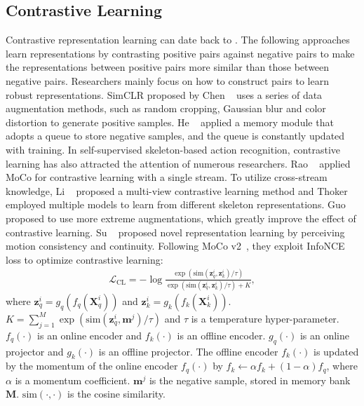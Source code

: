 \documentclass[twocolumn]{article}
\begin{document}
\subsection{Contrastive Learning}
\label{sec:contra}
Contrastive representation learning can date back to \cite{hadsell2006dimensionality}. The following approaches~\cite{tian2019contrastive,wu2018unsupervised,bachman2019learning,ye2019unsupervised,isola2015learning} learn representations by contrasting positive pairs against negative pairs to make the representations between positive pairs more similar than those between negative pairs. Researchers mainly focus on how to construct pairs to learn robust representations. SimCLR proposed by Chen \etal~\cite{chen2020simple} uses a series of data augmentation methods, such as random cropping, Gaussian blur and color distortion to generate positive samples. He \etal~\cite{he2020momentum} applied a memory module that adopts a queue to store negative samples, and the queue is constantly updated with training. In self-supervised skeleton-based action recognition, contrastive learning has also attracted the attention of numerous researchers. Rao \etal~\cite{rao2021augmented} applied MoCo for contrastive learning with a single stream. To utilize cross-stream knowledge, Li \etal~\cite{li20213d} proposed a multi-view contrastive learning method and Thoker \etal~\cite{thoker2021skeleton} employed multiple models to learn from different skeleton representations. Guo \etal~\cite{guo2021contrastive} proposed to use more extreme augmentations, which greatly improve the effect of contrastive learning. Su \etal~\cite{su2021self} proposed novel representation learning by perceiving motion consistency and continuity. 
Following MoCo v2~\cite{he2020momentum}, they exploit InfoNCE loss to optimize contrastive learning:
\begin{equation}
\label{equ:info}
\begin{aligned}
\mathcal{L}_{\text{CL}} = - \log \frac{\exp(\text{sim}(\mathbf{z}^i_q, \mathbf{z}^i_k) / \tau)}{\exp(\text{sim}(\mathbf{z}^i_q, \mathbf{z}^i_k)/ \tau) + K},
\end{aligned}
\end{equation}
where $\mathbf{z}^i_q = g_q(f_q(\mathbf{X}^i_q))$ and $\mathbf{z}^i_k = g_k(f_k(\mathbf{X}^i_k))$. $K = \sum_{j=1}^M \exp(\text{sim}(\mathbf{z}^i_q, \mathbf{m}^j)/ \tau)$ and $\tau$ is a temperature hyper-parameter. $f_q(\cdot)$ is an online encoder and $f_k(\cdot)$ is an offline encoder. $g_q(\cdot)$ is an online projector and $g_k(\cdot)$ is an offline projector. The offline encoder $f_k(\cdot)$ is updated by the momentum of the online encoder $f_q(\cdot)$ by $f_k \leftarrow \alpha f_k + (1 - \alpha) f_q$, where $\alpha$ is a momentum coefficient. $\mathbf{m}^j$ is the negative sample, stored in memory bank $\mathbf{M}$. $\text{sim}(\cdot,\cdot)$ is the cosine similarity.
\end{document}

